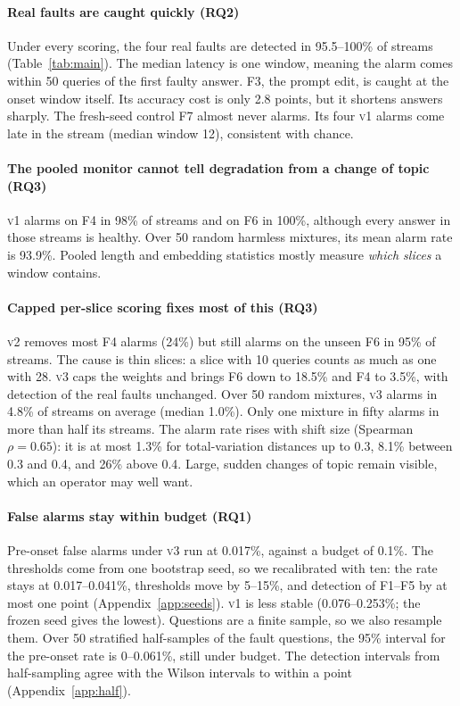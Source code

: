 \documentclass{article}
\newcommand{\vone}{\textsc{v1}}
\newcommand{\vtwo}{\textsc{v2}}
\newcommand{\vthree}{\textsc{v3}}
\begin{document}
\paragraph{Real faults are caught quickly (RQ2)}
Under every scoring, the four real faults are detected in 95.5--100\% of streams
(Table~\ref{tab:main}). The median latency is one window, meaning the alarm comes
within 50 queries of the first faulty answer. F3, the prompt edit, is caught at
the onset window itself. Its accuracy cost is only 2.8 points, but it shortens
answers sharply. The fresh-seed control F7 almost never alarms. Its four \vone{}
alarms come late in the stream (median window 12), consistent with chance.

\paragraph{The pooled monitor cannot tell degradation from a change of topic (RQ3)}
\vone{} alarms on F4 in 98\% of streams and on F6 in 100\%, although every answer
in those streams is healthy. Over 50 random harmless mixtures, its mean alarm rate
is 93.9\%. Pooled length and embedding statistics mostly measure \emph{which
slices} a window contains.

\paragraph{Capped per-slice scoring fixes most of this (RQ3)}
\vtwo{} removes most F4 alarms (24\%) but still alarms on the unseen F6 in 95\% of
streams. The cause is thin slices: a slice with 10 queries counts as much as one
with 28. \vthree{} caps the weights and brings F6 down to 18.5\% and F4 to 3.5\%,
with detection of the real faults unchanged. Over 50 random mixtures, \vthree{}
alarms in 4.8\% of streams on average (median 1.0\%). Only one mixture in fifty
alarms in more than half its streams. The alarm rate rises with shift size
(Spearman $\rho=0.65$): it is at most 1.3\% for total-variation distances up to
0.3, 8.1\% between 0.3 and 0.4, and 26\% above 0.4. Large, sudden changes of topic remain visible, which an
operator may well want.

\paragraph{False alarms stay within budget (RQ1)}
Pre-onset false alarms under \vthree{} run at 0.017\%, against a budget of 0.1\%.
The thresholds come from one bootstrap seed, so we recalibrated with ten: the
rate stays at 0.017--0.041\%, thresholds move by 5--15\%, and detection of F1--F5
by at most one point (Appendix~\ref{app:seeds}). \vone{} is less stable
(0.076--0.253\%; the frozen seed gives the lowest).
Questions are a finite sample, so we also resample them. Over 50 stratified
half-samples of the fault questions, the 95\% interval for the pre-onset rate is
0--0.061\%, still under budget. The detection intervals from half-sampling agree
with the Wilson intervals to within a point (Appendix~\ref{app:half}).
\end{document}
